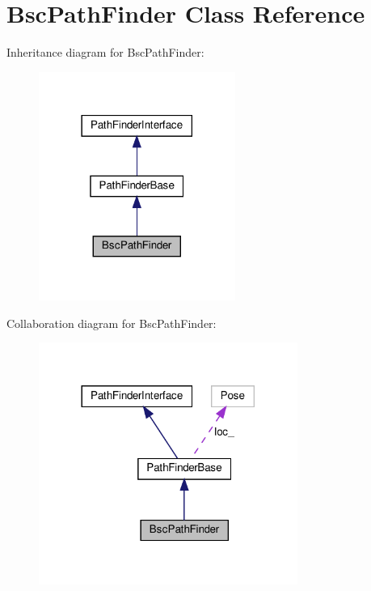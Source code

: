 \hypertarget{classBscPathFinder}{}\section{Bsc\+Path\+Finder Class Reference}
\label{classBscPathFinder}


Inheritance diagram for Bsc\+Path\+Finder\+:\nopagebreak
\begin{figure}[H]
\begin{center}
\leavevmode
\includegraphics[width=182pt]{classBscPathFinder__inherit__graph}
\end{center}
\end{figure}


Collaboration diagram for Bsc\+Path\+Finder\+:\nopagebreak
\begin{figure}[H]
\begin{center}
\leavevmode
\includegraphics[width=240pt]{classBscPathFinder__coll__graph}
\end{center}
\end{figure}

